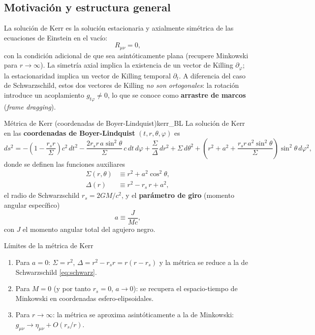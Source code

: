\subsection{Motivación y estructura general}

La solución de Kerr es la solución estacionaria y axialmente simétrica de las ecuaciones de Einstein en el vacío:
\begin{equation}
  R_{\mu\nu} = 0,
  \label{eq:vacio_kerr}
\end{equation}
con la condición adicional de que sea asintóticamente plana (recupere Minkowski para $r \to \infty$). La simetría axial implica la existencia de un vector de Killing $\partial_\varphi$; la estacionaridad implica un vector de Killing temporal $\partial_t$. A diferencia del caso de Schwarzschild, estos dos vectores de Killing \emph{no son ortogonales}: la rotación introduce un acoplamiento $g_{t\varphi} \neq 0$, lo que se conoce como \textbf{arrastre de marcos} (\textit{frame dragging}).

\begin{definicion}{Métrica de Kerr (coordenadas de Boyer-Lindquist)}{kerr_BL}
La solución de Kerr en las \textbf{coordenadas de Boyer-Lindquist} $(t, r, \theta, \varphi)$ es
\begin{equation}
  \boxed{ds^2 = -\!\left(1 - \frac{r_s r}{\Sigma}\right)c^2\,dt^2
  - \frac{2r_s r\,a\sin^2\!\theta}{\Sigma}\,c\,dt\,d\varphi
  + \frac{\Sigma}{\Delta}\,dr^2
  + \Sigma\,d\theta^2
  + \left(r^2 + a^2 + \frac{r_s r\,a^2\sin^2\!\theta}{\Sigma}\right)\sin^2\!\theta\,d\varphi^2,}
  \label{eq:kerr_BL}
\end{equation}
donde se definen las funciones auxiliares
\begin{align}
  \Sigma(r,\theta) &\equiv r^2 + a^2\cos^2\!\theta, \label{eq:Sigma_kerr}\\
  \Delta(r)        &\equiv r^2 - r_s\,r + a^2,       \label{eq:Delta_kerr}
\end{align}
el radio de Schwarzschild $r_s = 2GM/c^2$, y el \textbf{parámetro de giro} (momento angular específico)
\begin{equation}
  a \equiv \frac{J}{Mc},
  \label{eq:param_spin}
\end{equation}
con $J$ el momento angular total del agujero negro.
\end{definicion}

\begin{observacion}{Límites de la métrica de Kerr}{}
\begin{enumerate}[leftmargin=2em, label=(\alph*)]
  \item Para $a = 0$: $\Sigma = r^2$, $\Delta = r^2 - r_s r = r(r - r_s)$ y la métrica se reduce a la de Schwarzschild \eqref{eq:schwarz}.
  \item Para $M = 0$ (y por tanto $r_s = 0$, $a \to 0$): se recupera el espacio-tiempo de Minkowski en coordenadas esfero-elipsoidales.
  \item Para $r \to \infty$: la métrica se aproxima asintóticamente a la de Minkowski: $g_{\mu\nu} \to \eta_{\mu\nu} + O(r_s/r)$.
\end{enumerate}
\end{observacion}

